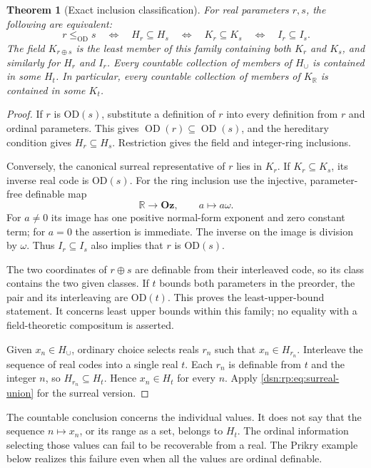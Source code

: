 \documentclass[11pt,a4paper]{article}
\numberwithin{equation}{section}
\newtheorem{theorem}{Theorem}[section]
\theoremstyle{definition}
\theoremstyle{remark}
\newcommand{\Oz}{\mathbf{Oz}}
\newcommand{\R}{\mathbb R}
\newcommand{\KR}{K_{\R}}
\newcommand{\Hcup}{H_{\cup}}
\begin{document}
\begin{theorem}[Exact inclusion classification]
\label{dsn:rp:thm:parameter-order}
For real parameters $r,s$, the following are equivalent:
\begin{equation}\label{dsn:rp:eq:parameter-order}
 r\leq_{\mathrm{OD}}s
 \quad\Longleftrightarrow\quad H_r\subseteq H_s
 \quad\Longleftrightarrow\quad K_r\subseteq K_s
 \quad\Longleftrightarrow\quad I_r\subseteq I_s.
\end{equation}
The field $K_{r\oplus s}$ is the least member of this family containing
both $K_r$ and $K_s$, and similarly for $H_r$ and $I_r$.
Every countable collection of members of $\Hcup$ is contained
in some $H_t$.  In particular, every countable collection of members of
$\KR$ is contained in some $K_t$.
\end{theorem}
\begin{proof}
If $r$ is OD$(s)$, substitute a definition of $r$ into every definition
from $r$ and ordinal parameters.  This gives
$\operatorname{OD}(r)\subseteq\operatorname{OD}(s)$, and the hereditary
condition gives $H_r\subseteq H_s$.  Restriction gives the field and
integer-ring inclusions.

Conversely, the canonical surreal representative of $r$ lies in $K_r$.
If $K_r\subseteq K_s$, its inverse real code is OD$(s)$.  For the ring
inclusion use the injective, parameter-free definable map
\[
 \mathbb R\longrightarrow\Oz,\qquad a\longmapsto a\omega.
\]
For $a\ne0$ its image has one positive normal-form exponent and zero
constant term; for $a=0$ the assertion is immediate.  The inverse on
the image is division by $\omega$.  Thus $I_r\subseteq I_s$ also
implies that $r$ is OD$(s)$.

The two coordinates of $r\oplus s$ are definable from their interleaved
code, so its class contains the two given classes.  If $t$ bounds both
parameters in the preorder, the pair and its interleaving are OD$(t)$.
This proves the least-upper-bound statement.  It concerns least upper
bounds within this family; no equality with a field-theoretic
compositum is asserted.

Given $x_n\in \Hcup$, ordinary choice selects reals $r_n$ such
that $x_n\in H_{r_n}$.  Interleave the sequence of real codes into a
single real $t$.  Each $r_n$ is definable from $t$ and the integer $n$,
so $H_{r_n}\subseteq H_t$.  Hence $x_n\in H_t$ for every $n$.
Apply \eqref{dsn:rp:eq:surreal-union} for the surreal version.
\end{proof}

The countable conclusion concerns the individual values.  It does not
say that the sequence $n\mapsto x_n$, or its range as a set, belongs to
$H_t$.  The ordinal information selecting those values can fail to be
recoverable from a real.  The Prikry example below realizes this
failure even when all the values are ordinal definable.
\end{document}
